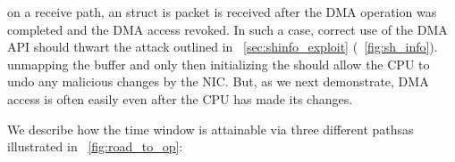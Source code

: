\DIFdelbegin {}\DIFdelend \DIFaddbegin {}\DIFaddend on a receive path, an \shinfo struct is \DIFdelbegin {}\DIFdelend \DIFaddbegin {}\DIFaddend packet is received \DIFdelbegin {}\DIFdelend \DIFaddbegin {}\DIFaddend after the DMA operation was completed and \DIFdelbegin {}\DIFdelend the DMA access \DIFaddbegin {}\DIFaddend revoked. In such a case,
\DIFdelbegin {}\DIFdelend correct use of the DMA API should thwart the attack outlined in \DIFdelbegin {}\DIFdelend \DIFaddbegin {}\DIFaddend ~\ref{sec:shinfo_exploit} (\DIFdelbegin {}\DIFdelend \DIFaddbegin {}\DIFaddend ~\ref{fig:sh_info}). \DIFdelbegin {}\DIFdelend \DIFaddbegin {}\DIFaddend unmapping the buffer and only then initializing the \shinfo{} should allow the CPU to undo any malicious changes \DIFaddbegin {}\DIFaddend by the NIC. But, as we next demonstrate, DMA access is often easily \DIFdelbegin {}\DIFdelend \DIFaddbegin {}\DIFaddend even after the CPU has made its changes. 

We \DIFdelbegin {}\DIFdelend \DIFaddbegin {}\DIFaddend describe how the time window is attainable via three different paths\DIFaddbegin \DIFadd{, }\DIFaddend as illustrated in \DIFdelbegin {}\DIFdelend \DIFaddbegin {}\DIFaddend ~\ref{fig:road_to_op}: 


